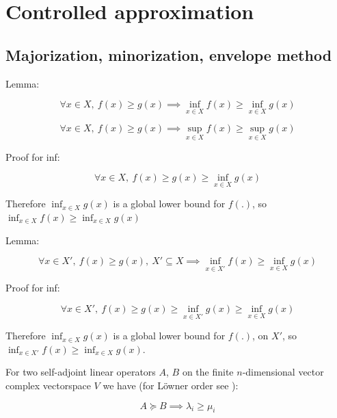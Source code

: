\documentclass{article}
\theoremstyle{definition}
\begin{document}
\section{Controlled approximation}

\subsection{Majorization, minorization, envelope method}

Lemma:

\begin{equation}
    \forall x \in X, \ f(x) \ge g(x) 
    \implies
    \inf_{x \in X} f(x) \ge \inf_{x \in X} g(x)
\end{equation}

\begin{equation}
    \forall x \in X, \ f(x) \ge g(x) 
    \implies
    \sup_{x \in X} f(x) \ge \sup_{x \in X} g(x)
\end{equation}

Proof for inf:

\begin{equation}
    \forall x \in X, \ 
    f(x) \ge g(x) 
    \ge 
    \inf_{x \in X} g(x)
\end{equation}

Therefore $\inf_{x \in X} g(x)$ is a global lower bound for $f(.)$, so $\inf_{x\in X} f(x) \ge \inf_{x \in X} g(x)$

Lemma:

\begin{equation}
    \forall x \in X', \ f(x) \ge g(x), \ 
    X' \subseteq X
    \implies
    \inf_{x \in X'} f(x) \ge \inf_{x \in X} g(x)
\end{equation}

Proof for inf:

\begin{equation}
    \forall x \in X', \ 
    f(x) \ge g(x) 
    \ge 
    \inf_{x \in X'} g(x)
    \ge
    \inf_{x \in X} g(x)
\end{equation}

Therefore $\inf_{x \in X} g(x)$ is a global lower bound for $f(.)$, on $X'$, so $\inf_{x\in X'} f(x) \ge \inf_{x \in X} g(x)$.


For two self-adjoint linear operators $A$, $B$ on the finite $n$-dimensional vector complex vectorspace $V$ we have (for Löwner order see \cite{book:Zhan2002,book:MarshallOlkinArnold2011}):

\begin{equation}
    A \succcurlyeq B
    \implies
    \lambda_i \ge \mu_i
\end{equation}
\end{document}
